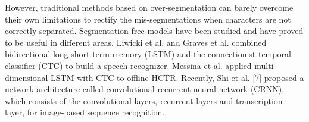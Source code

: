 \documentclass[10pt,conference,a4paper]{IEEEtran}
\begin{document}
However, traditional methods based on over-segmentation can barely overcome their own limitations to rectify the mis-segmentations when characters are not correctly separated.
Segmentation-free models\cite{liwicki2007novel,graves2009novel,messina2015segmentation,shi2015end,he2015reading}
have been studied and have proved to be useful in different areas.
Liwicki et al.\cite{liwicki2007novel} and Graves et al.\cite{graves2009novel} combined bidirectional long short-term memory (LSTM) and the connectionist temporal classifier (CTC) to build a speech recognizer.
Messina et al.\cite{messina2015segmentation} applied multi-dimensional LSTM with CTC to offline HCTR.
Recently, Shi et al. [7] proposed a network architecture called convolutional recurrent neural network (CRNN), which consists of the convolutional layers, recurrent layers and transcription layer, for image-based sequence recognition.
\end{document}
